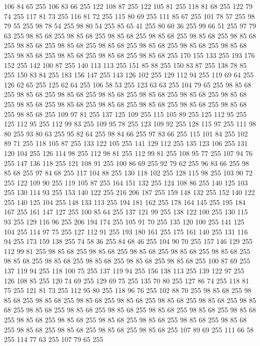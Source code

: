 106 84 65 255 106 83 66 255 122 108 87 255 122 105 81 255 118 81 68 255 122 79 74 255 117 81 73 255 116 81 72 255 115 80 69 255 111 85 67 255 101 78 57 255 98 79 55 255 98 78 54 255 98 80 54 255 85 65 41 255 80 60 36 255 99 66 51 255 97 79 63 255 98 85 68 255 98 85 68 255 98 85 68 255 98 85 68 255 98 85 68 255 98 85 68 255 98 85 68 255 98 85 68 255 98 85 68 255 98 85 68 255 98 85 68 255 98 85 68 255 98 85 68 255 98 85 68 255 98 85 68 255 98 85 68 255 170 155 133 255 193 176 152 255 142 100 87 255 140 113 113 255 151 85 88 255 150 83 87 255 138 78 85 255 150 83 84 255 183 156 147 255 143 126 102 255 129 112 94 255 119 69 64 255 126 62 65 255 125 62 64 255 106 58 53 255 123 63 63 255 104 79 65 255 98 85 68 255 98 85 68 255 98 85 68 255 98 85 68 255 98 85 68 255 98 85 68 255 98 85 68 255 98 85 68 255 98 85 68 255 98 85 68 255 98 85 68 255 98 85 68 255 98 85 68 255
98 85 68 255 109 97 81 255 137 125 109 255 115 105 89 255 125 112 95 255 125 112 95 255 112 99 83 255 109 95 78 255 123 109 92 255 128 115 97 255 111 98 80 255 93 80 63 255 95 82 64 255 98 84 66 255 97 83 66 255 115 101 84 255 102 89 71 255 118 105 87 255 133 122 105 255 141 129 112 255 135 123 106 255 131 120 104 255 126 114 98 255 112 98 81 255 112 99 81 255 108 95 77 255 107 94 76 255 147 136 118 255 121 108 91 255 100 86 69 255 92 79 62 255 96 83 66 255 98 85 68 255 97 84 68 255 117 104 88 255 130 118 102 255 128 115 98 255 103 90 72 255 122 109 90 255 119 105 87 255 164 151 132 255 124 108 86 255 140 125 103 255 130 114 93 255 153 140 122 255 216 206 187 255 159 148 132 255 152 140 122 255 140 125 104 255 148 133 113 255 194 181 162 255 178 164 145 255 195 184 167 255 161 147 127 255 100 85 64 255 137 121 99 255 138 122 100 255 130 115 93 255 129 116 96 255 206 194 174 255 105 91 70 255 135 120 100 255 141 125 104 255 114 97 75 255
127 112 91 255 193 180 161 255 175 161 140 255 131 116 94 255 173 159 138 255 74 58 36 255 84 68 46 255 104 90 70 255 157 146 129 255 112 99 81 255 98 85 68 255 98 85 68 255 98 85 68 255 98 85 68 255 98 85 68 255 98 85 68 255 98 85 68 255 98 85 68 255 98 85 68 255 98 85 68 255 100 87 69 255 137 119 94 255 118 100 75 255 137 119 94 255 156 138 113 255 139 122 97 255 126 108 85 255 120 74 69 255 129 69 75 255 135 70 80 255 127 86 74 255 118 81 75 255 121 81 73 255 112 95 80 255 118 96 76 255 102 88 70 255 98 85 68 255 98 85 68 255 98 85 68 255 98 85 68 255 98 85 68 255 98 85 68 255 98 85 68 255 98 85 68 255 98 85 68 255 98 85 68 255 98 85 68 255 98 85 68 255 98 85 68 255 98 85 68 255 98 85 68 255 98 85 68 255 98 85 68 255 98 85 68 255 98 85 68 255 98 85 68 255 98 85 68 255 98 85 68 255 98 85 68 255 98 85 68 255 107 89 69 255 111 66 58 255 114 77 63 255 107 79 65 255
